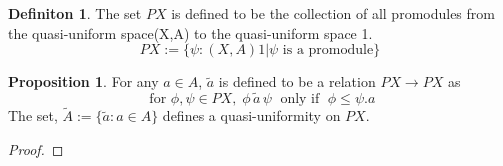 \documentclass[18pt,a4paper]{article}
\makeatletter
\theoremstyle{definition}
\newtheorem{definition}[theorem]{Definiton}
\newtheorem{proop}[theorem]{Proposition}
\newcommand{\carrow}{}%
\DeclareRobustCommand{\carrow}{%
	\mathrel{\vphantom{\rightarrow}\mathpalette\circle@arrow\relax}%
}
\newcommand{\circle@arrow}[2]{%
	\m@th
	\ooalign{%
		\hidewidth$#1\circ\mkern1mu$\hidewidth\cr
	$#1\longrightarrow$\cr}%
}
\makeatother
\begin{document}
\begin{definition}%
	The set $PX$ is defined to be the collection of all promodules from the quasi-uniform space(X,A)
	to the quasi-uniform space 1.
	\[PX:=\{\psi :(X,A) \carrow 1 | \psi \text{ is a promodule} \}\]
\end{definition}
\begin{proop}%
	For any $a\in A$, $\tilde{a}$ is defined to be a relation $PX \to PX$ as
	\[ \text{ for } \phi,\psi \in PX, \; \phi \, \tilde{a} \, \psi \; \text{ only if } \;
	\phi \leq \psi.a \]
	The set, $\tilde{A}:=\{\tilde{a}:a \in A\}$ defines a quasi-uniformity on $PX$.
\end{proop}
\begin{proof}\setcounter{equation}{0}


\end{proof}
\end{document}
